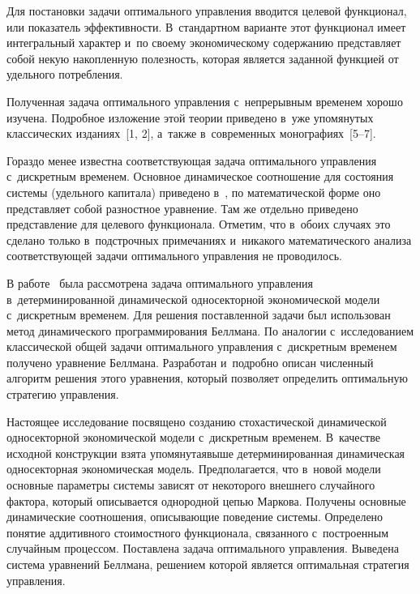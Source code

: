 \begin{multicols}{2}
     Для постановки задачи оптимального управления вводится целевой 
функционал, или показатель эффективности. В~стандартном варианте этот 
функционал имеет интегральный характер и~по своему экономическому 
содержанию пред\-став\-ля\-ет собой некую накопленную по\-лез\-ность, которая является 
заданной функцией от удельного по\-треб\-ле\-ния. 
{

}
     
     Полученная задача оптимального управления с~непрерывным временем 
хорошо изучена. Подробное изложение этой теории приведено в~уже упомянутых 
классических изданиях~[1, 2], а~также в~современных монографиях~[5--7].
     
     Гораздо менее известна соответствующая задача оптимального управления 
с~дискретным временем. Основное динамическое соотношение для со\-сто\-яния 
системы (удельного капитала) приведено в~\cite{1-sh}, по математической форме 
оно пред\-став\-ля\-ет собой раз\-ност\-ное урав\-не\-ние. Там же отдельно приведено 
пред\-став\-ле\-ние для целевого функционала. Отметим, что в~обоих случаях это 
сделано только в~подстрочных примечаниях и~никакого математического анализа 
со\-от\-вет\-ст\-ву\-ющей задачи оптимального управ\-ле\-ния не проводилось.
     
     В работе~\cite{8-sh} была рассмотрена задача оптимального управления 
в~детерминированной динамической односекторной экономической модели 
с~дискретным временем. Для решения поставленной задачи был использован 
метод динамического программирования Беллмана. По аналогии с~исследованием 
классической общей задачи оптимального управ\-ле\-ния с~дискретным 
временем~\cite[гл.~6]{3-sh} получено уравнение Беллмана. Разработан и~подробно 
описан численный алгоритм решения этого уравнения, который позволяет 
определить оптимальную стратегию управления.
     
     Настоящее исследование посвящено созданию стохастической динамической 
односекторной экономической модели с~дискретным временем. В~качестве 
исходной конструкции взята упомянутая\linebreak выше детерминированная динамическая 
односекторная экономическая модель. Предполагается, что в~новой модели 
основные па\-ра\-мет\-ры сис\-те\-мы зависят от некоторого внешнего случайного 
фактора, который описывается однородной цепью \mbox{Маркова}. Получены основные 
динамические соотношения, опи\-сы\-ва\-ющие поведение сис\-те\-мы. Определено 
понятие ад\-ди\-тив\-но\-го стоимостного функционала, связанного с~по\-стро\-ен\-ным 
случайным процессом. По\-став\-ле\-на задача оптимального управ\-ле\-ния. Выведена 
сис\-те\-ма уравнений Беллмана, решением которой является оптимальная стратегия 
управ\-ле\-ния.
{

}
\end{multicols}
